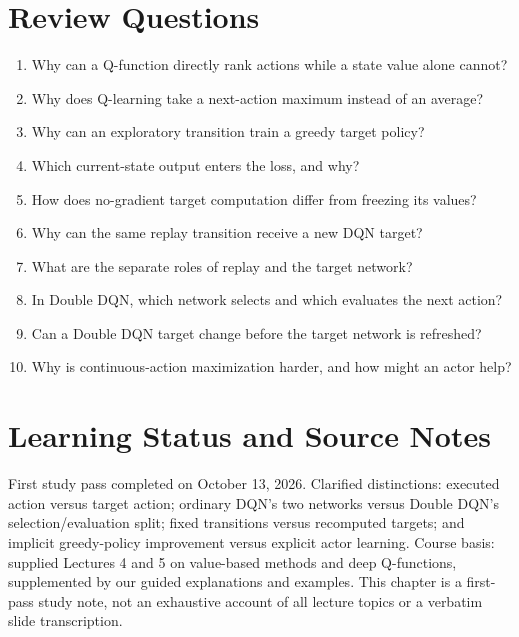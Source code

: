 \section{Review Questions}
\begin{enumerate}
\item Why can a Q-function directly rank actions while a state value alone cannot?
\item Why does Q-learning take a next-action maximum instead of an average?
\item Why can an exploratory transition train a greedy target policy?
\item Which current-state output enters the loss, and why?
\item How does no-gradient target computation differ from freezing its values?
\item Why can the same replay transition receive a new DQN target?
\item What are the separate roles of replay and the target network?
\item In Double DQN, which network selects and which evaluates the next action?
\item Can a Double DQN target change before the target network is refreshed?
\item Why is continuous-action maximization harder, and how might an actor help?
\end{enumerate}

\section{Learning Status and Source Notes}
First study pass completed on October 13, 2026.
Clarified distinctions: executed action versus target action;
ordinary DQN's two networks versus Double DQN's selection/evaluation split;
fixed transitions versus recomputed targets; and implicit greedy-policy
improvement versus explicit actor learning.
Course basis: supplied Lectures 4 and 5 on value-based methods and
deep Q-functions, supplemented by our guided explanations and examples.
This chapter is a first-pass study note, not an exhaustive account of
all lecture topics or a verbatim slide transcription.
